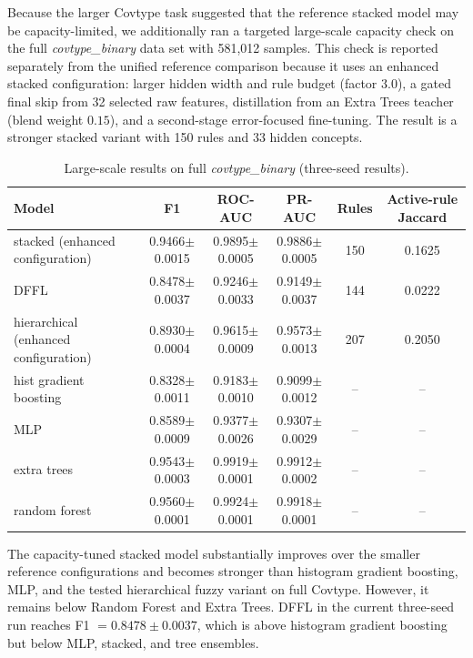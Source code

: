 \documentclass[runningheads]{llncs}
\begin{document}
Because the larger Covtype task suggested that the reference stacked model may be capacity-limited, we additionally ran a targeted large-scale capacity check on the full \textit{covtype\_binary} data set with 581,012 samples. This check is reported separately from the unified reference comparison because it uses an enhanced stacked configuration: larger hidden width and rule budget (factor $3.0$), a gated final skip from 32 selected raw features, distillation from an Extra Trees teacher (blend weight $0.15$), and a second-stage error-focused fine-tuning. The result is a stronger stacked variant with 150 rules and 33 hidden concepts.

\begin{table}[H]
\centering
\caption{Large-scale results on full \textit{covtype\_binary} (three-seed results).}
\label{tab:covtype_capacity_check}
\scriptsize
\setlength{\tabcolsep}{4pt}
\begin{tabular}{lccccc}
\toprule
Model & F1 & ROC-AUC & PR-AUC & Rules & Active-rule Jaccard \\
\midrule
stacked (enhanced configuration) & 0.9466$\pm$0.0015 & 0.9895$\pm$0.0005 & 0.9886$\pm$0.0005 & 150 & 0.1625 \\
DFFL & 0.8478$\pm$0.0037 & 0.9246$\pm$0.0033 & 0.9149$\pm$0.0037 & 144 & 0.0222 \\
hierarchical (enhanced configuration) & 0.8930$\pm$0.0004 & 0.9615$\pm$0.0009 & 0.9573$\pm$0.0013 & 207 & 0.2050 \\
hist gradient boosting & 0.8328$\pm$0.0011 & 0.9183$\pm$0.0010 & 0.9099$\pm$0.0012 & -- & -- \\
MLP & 0.8589$\pm$0.0009 & 0.9377$\pm$0.0026 & 0.9307$\pm$0.0029 & -- & -- \\
extra trees & 0.9543$\pm$0.0003 & 0.9919$\pm$0.0001 & 0.9912$\pm$0.0002 & -- & -- \\
random forest & 0.9560$\pm$0.0001 & 0.9924$\pm$0.0001 & 0.9918$\pm$0.0001 & -- & -- \\
\bottomrule
\end{tabular}
\end{table}

The capacity-tuned stacked model substantially improves over the smaller reference configurations and becomes stronger than histogram gradient boosting, MLP, and the tested hierarchical fuzzy variant on full Covtype. However, it remains below Random Forest and Extra Trees. DFFL in the current three-seed run reaches F1 $=0.8478\pm0.0037$, which is above histogram gradient boosting but below MLP, stacked, and tree ensembles.
\end{document}
